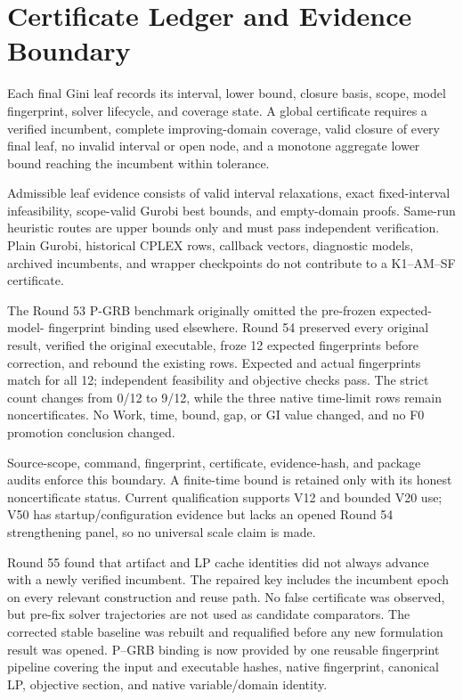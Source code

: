 \section{Certificate Ledger and Evidence Boundary}
Each final Gini leaf records its interval, lower bound, closure basis, scope,
model fingerprint, solver lifecycle, and coverage state. A global certificate
requires a verified incumbent, complete improving-domain coverage, valid
closure of every final leaf, no invalid interval or open node, and a monotone
aggregate lower bound reaching the incumbent within tolerance.

Admissible leaf evidence consists of valid interval relaxations, exact
fixed-interval infeasibility, scope-valid Gurobi best bounds, and empty-domain
proofs. Same-run heuristic routes are upper bounds only and must pass
independent verification. Plain Gurobi, historical CPLEX rows, callback
vectors, diagnostic models, archived incumbents, and wrapper checkpoints do
not contribute to a K1--AM--SF certificate.

The Round 53 P-GRB benchmark originally omitted the pre-frozen expected-model-
fingerprint binding used elsewhere. Round 54 preserved every original result,
verified the original executable, froze 12 expected fingerprints before
correction, and rebound the existing rows. Expected and actual fingerprints
match for all 12; independent feasibility and objective checks pass. The
strict count changes from 0/12 to 9/12, while the three native time-limit rows
remain noncertificates. No Work, time, bound, gap, or GI value changed, and no
F0 promotion conclusion changed.

Source-scope, command, fingerprint, certificate, evidence-hash, and package
audits enforce this boundary. A finite-time bound is retained only with its
honest noncertificate status. Current qualification supports V12 and bounded
V20 use; V50 has startup/configuration evidence but lacks an opened Round 54
strengthening panel, so no universal scale claim is made.

Round 55 found that artifact and LP cache identities did not always advance
with a newly verified incumbent. The repaired key includes the incumbent
epoch on every relevant construction and reuse path. No false certificate was
observed, but pre-fix solver trajectories are not used as candidate
comparators. The corrected stable baseline was rebuilt and requalified before
any new formulation result was opened. P--GRB binding is now provided by one
reusable fingerprint pipeline covering the input and executable hashes,
native fingerprint, canonical LP, objective section, and native variable/domain
identity.
